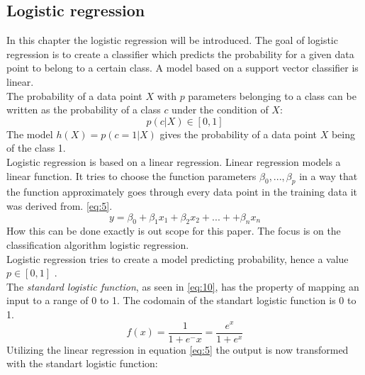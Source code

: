 
\subsection{Logistic regression}
In this chapter the logistic regression will be introduced. The goal of logistic regression is to create a classifier which predicts the probability for a given data point  to belong to a certain class. A model based on a support vector classifier is linear.
\\

The probability of a data point $X$ with $p$ parameters belonging to a class can be written as the probability of a class $c$ under the condition of $X$:
\begin{equation} \label{eq:4}
p(c|X) \in [0,1]
\end{equation}
The model $h(X)=p(c=1|X)$ gives the probability of a data point $X$ being of the class 1.
\\

Logistic regression is based on a linear regression. Linear regression models a linear function. It tries to choose the function parameters $\beta_0, ..., \beta_p$ in a way  that the function approximately goes through every data point in the training data it was derived from. \ref{eq:5}. 
\begin{equation} \label{eq:5}
y=\beta_0 + \beta_1 x_1 + \beta_2 x_2 + ... + + \beta_n x_n
\end{equation}
How this can be done exactly is out scope for this paper. The focus is on the classification algorithm logistic regression.\\
Logistic regression tries to create a model predicting probability, hence a value $p \in [0,1]$ . \\
The \emph{standard logistic function}, as seen in \ref{eq:10}, has the property of mapping an input to a range of 0 to 1. The codomain of the standart logistic function is 0 to 1.
\begin{equation} \label{eq:10}
f(x)=\frac{1}{1+e^-x}=\frac{e^x}{1+e^x}
\end{equation}
Utilizing the linear regression in equation \ref{eq:5} the output is now transformed with the standart logistic function:


